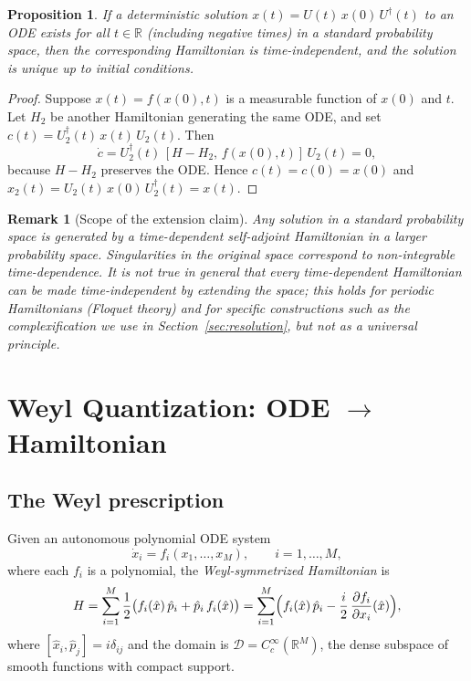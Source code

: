 \documentclass[11pt,a4paper]{article}
\newtheorem{proposition}[theorem]{Proposition}
\newtheorem{remark}{Remark}
\newcommand{\Rset}{\mathbb{R}}
\newcommand{\Dom}{\mathcal{D}}
\begin{document}
\begin{proposition}\label{prop:unique-sol}
If a deterministic solution $x(t)=U(t)\,x(0)\,U^{\dagger}(t)$ to an ODE
exists for all $t\in\Rset$ (including negative times) in a standard
probability space, then the corresponding Hamiltonian is
time-independent, and the solution is unique up to initial conditions.
\end{proposition}

\begin{proof}
Suppose $x(t)=f(x(0),t)$ is a measurable function of $x(0)$ and $t$.
Let $H_{2}$ be another Hamiltonian generating the same ODE, and set
$c(t)=U_{2}^{\dagger}(t)\,x(t)\,U_{2}(t)$.  Then
\[
  \dot{c}=U_{2}^{\dagger}(t)\,[H-H_{2},\,f(x(0),t)]\,U_{2}(t)=0,
\]
because $H-H_{2}$ preserves the ODE.  Hence $c(t)=c(0)=x(0)$ and
$x_{2}(t)=U_{2}(t)\,x(0)\,U_{2}^{\dagger}(t)=x(t)$.
\end{proof}

\begin{remark}[Scope of the extension claim]
Any solution in a standard probability space is generated by a
time-dependent self-adjoint Hamiltonian in a \emph{larger} probability
space.  Singularities in the original space correspond to non-integrable
time-dependence.  It is \emph{not} true in general that every
time-dependent Hamiltonian can be made time-independent by extending the
space; this holds for periodic Hamiltonians (Floquet theory) and for
specific constructions such as the complexification we use in
Section~\ref{sec:resolution}, but not as a universal principle.
\end{remark}

\section{Weyl Quantization: ODE $\to$ Hamiltonian}\label{sec:weyl}

\subsection{The Weyl prescription}

Given an autonomous polynomial ODE system
\begin{equation}\label{eq:ode-system}
  \dot{x}_{i}=f_{i}(x_{1},\dots,x_{M}),\qquad i=1,\dots,M,
\end{equation}
where each $f_{i}$ is a polynomial, the \emph{Weyl-symmetrized
Hamiltonian} is
\begin{equation}\label{eq:weyl-H}
  H=\sum_{i=1}^{M}\frac{1}{2}\bigl(f_{i}(\hat{x})\,\hat{p}_{i}
    +\hat{p}_{i}\,f_{i}(\hat{x})\bigr)
  =\sum_{i=1}^{M}\Bigl(f_{i}(\hat{x})\,\hat{p}_{i}
    -\frac{i}{2}\,\frac{\partial f_{i}}{\partial x_{i}}(\hat{x})\Bigr),
\end{equation}
where $[\hat{x}_{i},\hat{p}_{j}]=i\delta_{ij}$ and the domain is
$\Dom=C^{\infty}_{c}(\Rset^{M})$, the dense subspace of smooth functions
with compact support.
\end{document}
